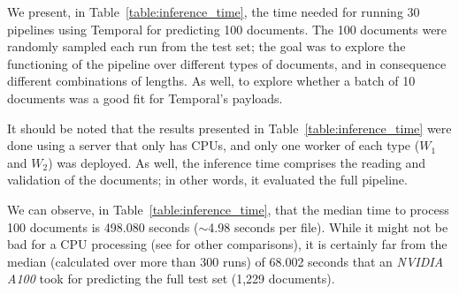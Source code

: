 \documentclass[11pt]{article}
\begin{document}
    We present, in Table~\ref{table:inference_time}, the time needed for running 30 pipelines using Temporal for predicting 100 documents. The 100 documents were randomly sampled each run from the test set; the goal was to explore the functioning of the pipeline over different types of documents, and in consequence different combinations of lengths. As well, to explore whether a batch of 10 documents was a good fit for Temporal's payloads.

    

    It should be noted that the results presented in Table~\ref{table:inference_time} were done using a server that only has CPUs, and only one worker of each type ($W_1$ and $W_2$) was deployed. As well, the inference time comprises the reading and validation of the documents; in other words, it evaluated the full pipeline.

    We can observe, in Table~\ref{table:inference_time}, that the median time to process 100 documents is 498.080 seconds ($\sim$4.98 seconds per file). While it might not be bad for a CPU processing (see \citealp{park_efficient_2022} for other comparisons), it is certainly far from the median (calculated over more than 300 runs) of 68.002 seconds that an \textit{NVIDIA A100} took for predicting the full test set (1,229 documents).%


    
    
    
    
\end{document}
